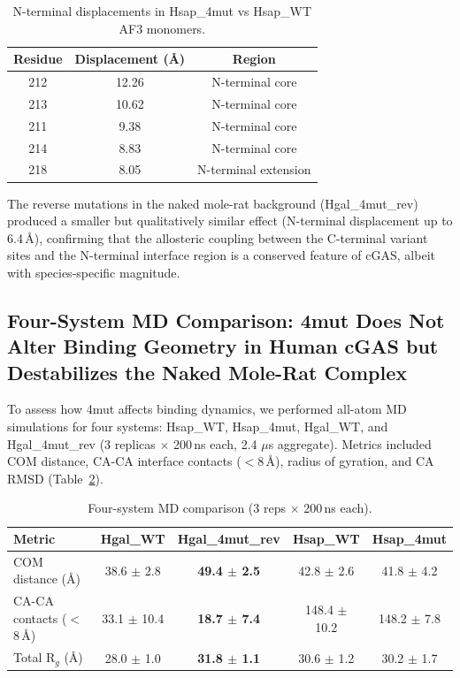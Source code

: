\documentclass[journal=jcisd8, manuscript=article]{achemso}
\begin{document}
\begin{table}[htbp]
\centering
\caption{N-terminal displacements in Hsap\_4mut vs Hsap\_WT AF3 monomers.}
\label{tab:displacement}
\begin{tabular}{@{}ccc@{}}
\toprule
Residue & Displacement (\AA) & Region \\
\midrule
212 & 12.26 & N-terminal core \\
213 & 10.62 & N-terminal core \\
211 & 9.38 & N-terminal core \\
214 & 8.83 & N-terminal core \\
218 & 8.05 & N-terminal extension \\
\bottomrule
\end{tabular}
\end{table}

The reverse mutations in the naked mole-rat background (Hgal\_4mut\_rev) produced a smaller but qualitatively similar effect (N-terminal displacement up to 6.4\,\AA), confirming that the allosteric coupling between the C-terminal variant sites and the N-terminal interface region is a conserved feature of cGAS, albeit with species-specific magnitude.

\subsection{Four-System MD Comparison: 4mut Does Not Alter Binding Geometry in Human cGAS but Destabilizes the Naked Mole-Rat Complex}

To assess how 4mut affects binding dynamics, we performed all-atom MD simulations for four systems: Hsap\_WT, Hsap\_4mut, Hgal\_WT, and Hgal\_4mut\_rev (3 replicas $\times$ 200\,ns each, 2.4 $\mu$s aggregate). Metrics included COM distance, CA-CA interface contacts ($<$8\,\AA), radius of gyration, and CA RMSD (Table~\ref{tab:four_system}).

\begin{table}[htbp]
\centering
\caption{Four-system MD comparison (3 reps $\times$ 200\,ns each).}
\label{tab:four_system}
\begin{tabular}{@{}lcccc@{}}
\toprule
Metric & Hgal\_WT & Hgal\_4mut\_rev & Hsap\_WT & Hsap\_4mut \\
\midrule
COM distance (\AA) & 38.6 $\pm$ 2.8 & \textbf{49.4 $\pm$ 2.5} & 42.8 $\pm$ 2.6 & 41.8 $\pm$ 4.2 \\
CA-CA contacts ($<$8\,\AA) & 33.1 $\pm$ 10.4 & \textbf{18.7 $\pm$ 7.4} & 148.4 $\pm$ 10.2 & 148.2 $\pm$ 7.8 \\
Total R$_g$ (\AA) & 28.0 $\pm$ 1.0 & \textbf{31.8 $\pm$ 1.1} & 30.6 $\pm$ 1.2 & 30.2 $\pm$ 1.7 \\
\bottomrule
\end{tabular}
\end{table}
\end{document}
